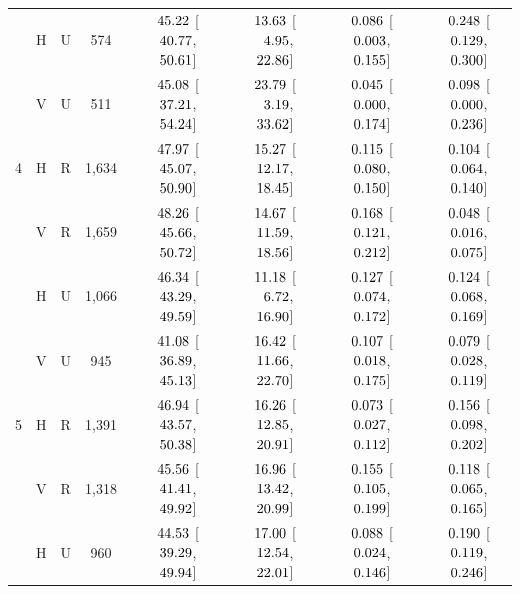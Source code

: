\begin{landscape}
\begin{longtable}{lccccccc}
 & H & U & 574 & $\hphantom{-}45.22$ [$\hphantom{-}40.77$, $\hphantom{-}50.61$] & $\hphantom{-}13.63$ [$\hphantom{-}\hphantom{0}4.95$, $\hphantom{-}22.86$] & $\hphantom{-}0.086$ [$\hphantom{-}0.003$, $\hphantom{-}0.155$] & $\hphantom{-}0.248$ [$\hphantom{-}0.129$, $\hphantom{-}0.300$] \\
 & V & U & 511 & $\hphantom{-}45.08$ [$\hphantom{-}37.21$, $\hphantom{-}54.24$] & $\hphantom{-}23.79$ [$\hphantom{-}\hphantom{0}3.19$, $\hphantom{-}33.62$] & $\hphantom{-}0.045$ [$\hphantom{-}0.000$, $\hphantom{-}0.174$] & $\hphantom{-}0.098$ [$\hphantom{-}0.000$, $\hphantom{-}0.236$] \\
4 & H & R & 1,634 & $\hphantom{-}47.97$ [$\hphantom{-}45.07$, $\hphantom{-}50.90$] & $\hphantom{-}15.27$ [$\hphantom{-}12.17$, $\hphantom{-}18.45$] & $\hphantom{-}0.115$ [$\hphantom{-}0.080$, $\hphantom{-}0.150$] & $\hphantom{-}0.104$ [$\hphantom{-}0.064$, $\hphantom{-}0.140$] \\
 & V & R & 1,659 & $\hphantom{-}48.26$ [$\hphantom{-}45.66$, $\hphantom{-}50.72$] & $\hphantom{-}14.67$ [$\hphantom{-}11.59$, $\hphantom{-}18.56$] & $\hphantom{-}0.168$ [$\hphantom{-}0.121$, $\hphantom{-}0.212$] & $\hphantom{-}0.048$ [$\hphantom{-}0.016$, $\hphantom{-}0.075$] \\
 & H & U & 1,066 & $\hphantom{-}46.34$ [$\hphantom{-}43.29$, $\hphantom{-}49.59$] & $\hphantom{-}11.18$ [$\hphantom{-}\hphantom{0}6.72$, $\hphantom{-}16.90$] & $\hphantom{-}0.127$ [$\hphantom{-}0.074$, $\hphantom{-}0.172$] & $\hphantom{-}0.124$ [$\hphantom{-}0.068$, $\hphantom{-}0.169$] \\
 & V & U & 945 & $\hphantom{-}41.08$ [$\hphantom{-}36.89$, $\hphantom{-}45.13$] & $\hphantom{-}16.42$ [$\hphantom{-}11.66$, $\hphantom{-}22.70$] & $\hphantom{-}0.107$ [$\hphantom{-}0.018$, $\hphantom{-}0.175$] & $\hphantom{-}0.079$ [$\hphantom{-}0.028$, $\hphantom{-}0.119$] \\
5 & H & R & 1,391 & $\hphantom{-}46.94$ [$\hphantom{-}43.57$, $\hphantom{-}50.38$] & $\hphantom{-}16.26$ [$\hphantom{-}12.85$, $\hphantom{-}20.91$] & $\hphantom{-}0.073$ [$\hphantom{-}0.027$, $\hphantom{-}0.112$] & $\hphantom{-}0.156$ [$\hphantom{-}0.098$, $\hphantom{-}0.202$] \\
 & V & R & 1,318 & $\hphantom{-}45.56$ [$\hphantom{-}41.41$, $\hphantom{-}49.92$] & $\hphantom{-}16.96$ [$\hphantom{-}13.42$, $\hphantom{-}20.99$] & $\hphantom{-}0.155$ [$\hphantom{-}0.105$, $\hphantom{-}0.199$] & $\hphantom{-}0.118$ [$\hphantom{-}0.065$, $\hphantom{-}0.165$] \\
 & H & U & 960 & $\hphantom{-}44.53$ [$\hphantom{-}39.29$, $\hphantom{-}49.94$] & $\hphantom{-}17.00$ [$\hphantom{-}12.54$, $\hphantom{-}22.01$] & $\hphantom{-}0.088$ [$\hphantom{-}0.024$, $\hphantom{-}0.146$] & $\hphantom{-}0.190$ [$\hphantom{-}0.119$, $\hphantom{-}0.246$] \\

\end{longtable}
\end{landscape}
